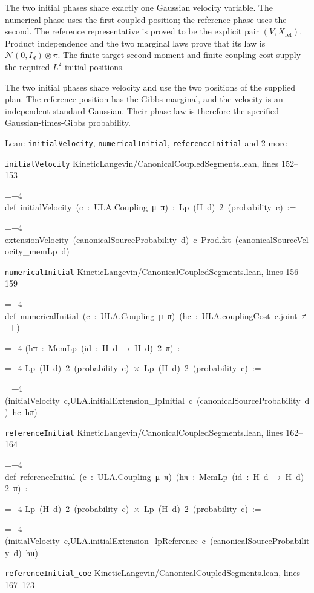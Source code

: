 \documentclass[11pt,a4paper]{article}
\newlength{\leancharwidth}
\newenvironment{leancode}{\par\smallskip\begingroup\ttfamily\footnotesize\raggedright
  \settowidth{\leancharwidth}{M}\setlength{\parskip}{0pt}\setlength{\parindent}{0pt}
  \frenchspacing}{\par\endgroup\smallskip}
\newcommand{\leanline}[2]{\hangindent=\dimexpr#1\leancharwidth+4\leancharwidth\relax
  \hangafter=1\noindent\hspace*{#1\leancharwidth}#2\par}
\newcommand{\leansource}[1]{\par{\footnotesize\color{leanmuted}#1}\par}
\begin{document}
The two initial phases share exactly one Gaussian velocity variable. The numerical phase uses the first coupled position; the reference phase uses the second. The reference representative is proved to be the explicit pair \((V,X_\mathrm{ref})\). Product independence and the two marginal laws prove that its law is \(\mathcal N(0,I_d)\otimes\pi\). The finite target second moment and finite coupling cost supply the required \(L^{2}\) initial positions.



The two initial phases share velocity and use the two positions of the supplied plan. The reference position has the Gibbs marginal, and the velocity is an independent standard Gaussian. Their phase law is therefore the specified Gaussian-times-Gibbs probability.

\begin{leanbox}{Lean: \texttt{initialVelocity}, \texttt{numericalInitial}, \texttt{referenceInitial} and 2 more}
\leansource{\texttt{initialVelocity} \quad KineticLangevin/\allowbreak{}CanonicalCoupledSegments.lean, lines 152–153}
\begin{leancode}
\leanline{0}{def\ initialVelocity\ (c\ :\ ULA.Coupling\ μ\ π)\ :\ Lp\ (H\ d)\ 2\ (probability\ c)\ :=}
\leanline{2}{extensionVelocity\ (canonicalSourceProbability\ d)\ c\ Prod.fst\ (canonicalSourceVelocity\_memLp\ d)}
\end{leancode}
\leansource{\texttt{numericalInitial} \quad KineticLangevin/\allowbreak{}CanonicalCoupledSegments.lean, lines 156–159}
\begin{leancode}
\leanline{0}{def\ numericalInitial\ (c\ :\ ULA.Coupling\ μ\ π)\ (hc\ :\ ULA.couplingCost\ c.joint\ ≠\ ⊤)}
\leanline{4}{(hπ\ :\ MemLp\ (id\ :\ H\ d\ →\ H\ d)\ 2\ π)\ :}
\leanline{4}{Lp\ (H\ d)\ 2\ (probability\ c)\ ×\ Lp\ (H\ d)\ 2\ (probability\ c)\ :=}
\leanline{2}{(initialVelocity\ c,ULA.initialExtension\_lpInitial\ c\ (canonicalSourceProbability\ d)\ hc\ hπ)}
\end{leancode}
\leansource{\texttt{referenceInitial} \quad KineticLangevin/\allowbreak{}CanonicalCoupledSegments.lean, lines 162–164}
\begin{leancode}
\leanline{0}{def\ referenceInitial\ (c\ :\ ULA.Coupling\ μ\ π)\ (hπ\ :\ MemLp\ (id\ :\ H\ d\ →\ H\ d)\ 2\ π)\ :}
\leanline{4}{Lp\ (H\ d)\ 2\ (probability\ c)\ ×\ Lp\ (H\ d)\ 2\ (probability\ c)\ :=}
\leanline{2}{(initialVelocity\ c,ULA.initialExtension\_lpReference\ c\ (canonicalSourceProbability\ d)\ hπ)}
\end{leancode}
\leansource{\texttt{referenceInitial\_\allowbreak{}coe} \quad KineticLangevin/\allowbreak{}CanonicalCoupledSegments.lean, lines 167–173}

\end{leanbox}
\end{document}

